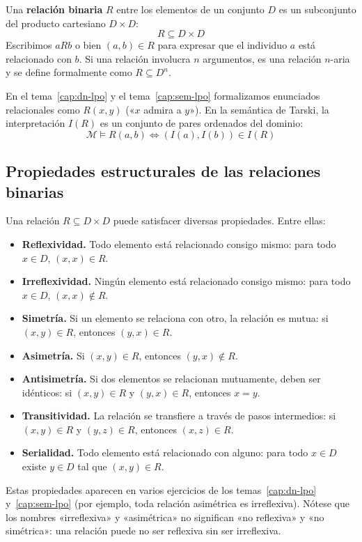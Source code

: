 \begin{definicion}
Una \textbf{relación binaria} $R$ entre los elementos de un conjunto $D$ es un subconjunto del producto cartesiano $D \times D$:
\[
R \subseteq D \times D
\]
Escribimos $a R b$ o bien $(a, b) \in R$ para expresar que el individuo $a$ está relacionado con $b$. Si una relación involucra $n$ argumentos, es una relación $n$-aria y se define formalmente como $R \subseteq D^n$.
\end{definicion}

\begin{aplicacion}
En el tema~\ref{cap:dn-lpo} y el tema~\ref{cap:sem-lpo} formalizamos enunciados relacionales como $R(x, y)$ («$x$ admira a $y$»). En la semántica de Tarski, la interpretación $I(R)$ es un conjunto de pares ordenados del dominio:
\[
\mathcal{M} \models R(a, b) \iff (I(a), I(b)) \in I(R)
\]
\end{aplicacion}

\subsection{Propiedades estructurales de las relaciones binarias}
Una relación $R \subseteq D \times D$ puede satisfacer diversas
propiedades. Entre ellas:

\begin{itemize}
    \item \textbf{Reflexividad.} Todo elemento está relacionado consigo mismo: para todo $x \in D$, $(x, x) \in R$.
    \item \textbf{Irreflexividad.} Ningún elemento está relacionado consigo mismo: para todo $x \in D$, $(x, x) \notin R$.
    \item \textbf{Simetría.} Si un elemento se relaciona con otro, la relación es mutua: si $(x, y) \in R$, entonces $(y, x) \in R$.
    \item \textbf{Asimetría.} Si $(x, y) \in R$, entonces $(y, x) \notin R$.
    \item \textbf{Antisimetría.} Si dos elementos se relacionan mutuamente, deben ser idénticos: si $(x, y) \in R$ y $(y, x) \in R$, entonces $x = y$.
    \item \textbf{Transitividad.} La relación se transfiere a través de pasos intermedios: si $(x, y) \in R$ y $(y, z) \in R$, entonces $(x, z) \in R$.
    \item \textbf{Serialidad.} Todo elemento está relacionado con alguno: para todo $x \in D$ existe $y \in D$ tal que $(x, y) \in R$.
\end{itemize}
Estas propiedades aparecen en varios ejercicios de los temas~\ref{cap:dn-lpo} y~\ref{cap:sem-lpo} (por ejemplo, toda relación asimétrica es irreflexiva). Nótese que los nombres «irreflexiva» y «asimétrica» no significan «no reflexiva» y «no simétrica»: una relación puede no ser reflexiva sin ser irreflexiva.

